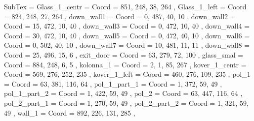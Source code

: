 SubTex = {
	Glass_1_centr								= { Coord = { 851, 248, 38, 264 } },
	Glass_1_left								= { Coord = { 824, 248, 27, 264 } },
	down_wall1								= { Coord = { 0, 487, 40, 10 } },
	down_wall2								= { Coord = { 15, 472, 10, 40 } },
	down_wall3								= { Coord = { 0, 472, 10, 40 } },
	down_wall4								= { Coord = { 30, 472, 10, 40 } },
	down_wall5								= { Coord = { 0, 472, 40, 10 } },
	down_wall6								= { Coord = { 0, 502, 40, 10 } },
	down_wall7								= { Coord = { 10, 481, 11, 11 } },
	down_wall8								= { Coord = { 25, 496, 15, 6 } },
	exit_door								= { Coord = { 63, 279, 72, 100 } },
	glass_smal								= { Coord = { 884, 248, 6, 5 } },
	kolonna_1								= { Coord = { 2, 1, 85, 267 } },
	kover_1_centr								= { Coord = { 569, 276, 252, 235 } },
	kover_1_left								= { Coord = { 460, 276, 109, 235 } },
	pol_1								= { Coord = { 63, 381, 116, 64 } },
	pol_1_part_1								= { Coord = { 1, 372, 59, 49 } },
	pol_1_part_2								= { Coord = { 1, 422, 59, 49 } },
	pol_2								= { Coord = { 63, 447, 116, 64 } },
	pol_2_part_1								= { Coord = { 1, 270, 59, 49 } },
	pol_2_part_2								= { Coord = { 1, 321, 59, 49 } },
	wall_1								= { Coord = { 892, 226, 131, 285 } },
}
